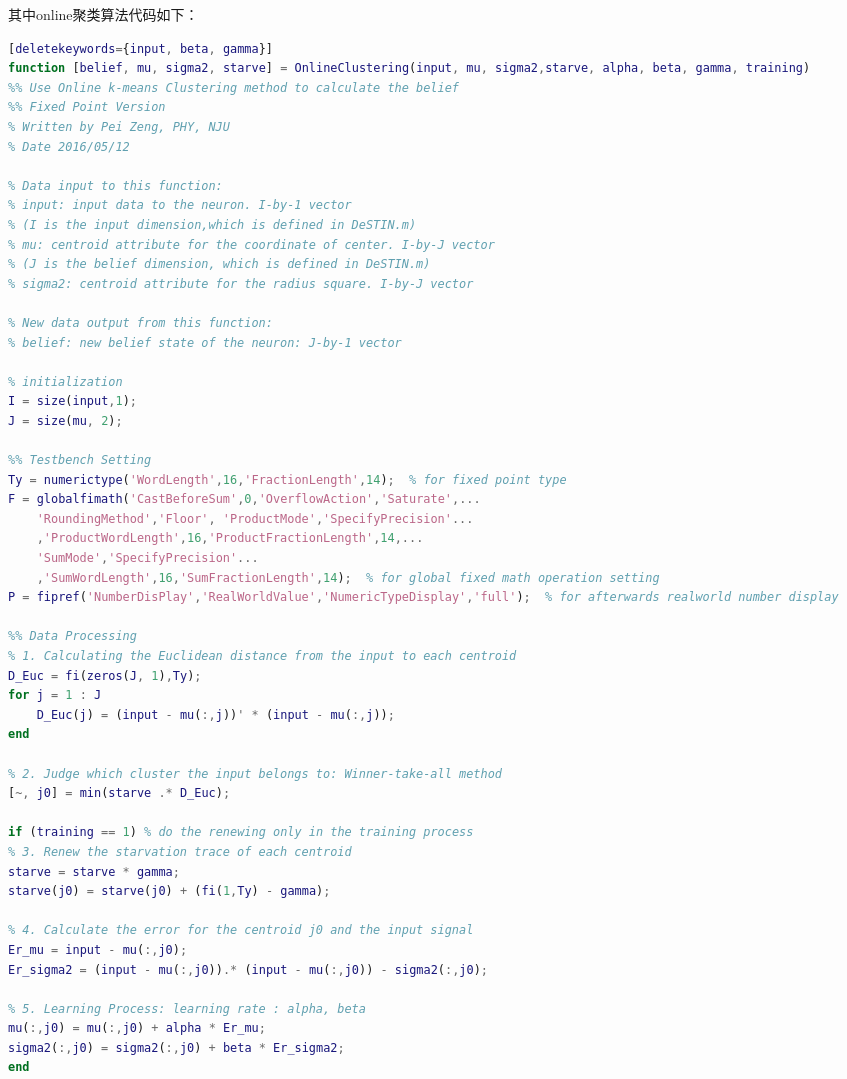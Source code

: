 其中online聚类算法代码如下：
\begin{spacing}{1}
\begin{lstlisting}[language=Matlab][deletekeywords={input, beta, gamma}]
function [belief, mu, sigma2, starve] = OnlineClustering(input, mu, sigma2,starve, alpha, beta, gamma, training)
%% Use Online k-means Clustering method to calculate the belief
%% Fixed Point Version
% Written by Pei Zeng, PHY, NJU
% Date 2016/05/12

% Data input to this function: 
% input: input data to the neuron. I-by-1 vector 
% (I is the input dimension,which is defined in DeSTIN.m)
% mu: centroid attribute for the coordinate of center. I-by-J vector
% (J is the belief dimension, which is defined in DeSTIN.m)
% sigma2: centroid attribute for the radius square. I-by-J vector

% New data output from this function:
% belief: new belief state of the neuron: J-by-1 vector

% initialization
I = size(input,1);
J = size(mu, 2);

%% Testbench Setting
Ty = numerictype('WordLength',16,'FractionLength',14);  % for fixed point type
F = globalfimath('CastBeforeSum',0,'OverflowAction','Saturate',...
    'RoundingMethod','Floor', 'ProductMode','SpecifyPrecision'...    
    ,'ProductWordLength',16,'ProductFractionLength',14,... 
    'SumMode','SpecifyPrecision'...    
    ,'SumWordLength',16,'SumFractionLength',14);  % for global fixed math operation setting
P = fipref('NumberDisPlay','RealWorldValue','NumericTypeDisplay','full');  % for afterwards realworld number display

%% Data Processing
% 1. Calculating the Euclidean distance from the input to each centroid
D_Euc = fi(zeros(J, 1),Ty);
for j = 1 : J
    D_Euc(j) = (input - mu(:,j))' * (input - mu(:,j));
end

% 2. Judge which cluster the input belongs to: Winner-take-all method
[~, j0] = min(starve .* D_Euc);

if (training == 1) % do the renewing only in the training process
% 3. Renew the starvation trace of each centroid
starve = starve * gamma;
starve(j0) = starve(j0) + (fi(1,Ty) - gamma);

% 4. Calculate the error for the centroid j0 and the input signal
Er_mu = input - mu(:,j0);
Er_sigma2 = (input - mu(:,j0)).* (input - mu(:,j0)) - sigma2(:,j0);

% 5. Learning Process: learning rate : alpha, beta
mu(:,j0) = mu(:,j0) + alpha * Er_mu;
sigma2(:,j0) = sigma2(:,j0) + beta * Er_sigma2;
end


\end{lstlisting}
\end{spacing}
